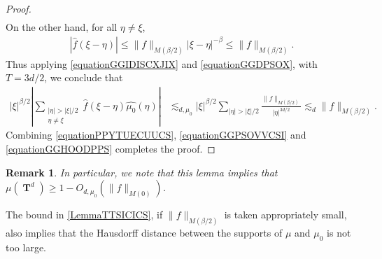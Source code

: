 \documentclass[12pt,reqno]{article}
\numberwithin{equation}{section}
\DeclareMathOperator{\TT}{\mathbf{T}}
\newtheorem{remark}{Remark}
\begin{document}
\begin{proof}
\begin{equation}
\begin{split}
    \end{split}
    \end{equation}
    On the other hand, for all $\eta \neq \xi$,
    \begin{equation} \label{equationGGDPSOX}
    \begin{split}
        |\widehat{f}(\xi - \eta)| \leq  \| f \|_{M(\beta/2)} |\xi - \eta|^{-\beta} \leq \| f \|_{M(\beta/2)}.
    \end{split}
    \end{equation}
    Thus applying \eqref{equationGGIDISCXJIX} and \eqref{equationGGDPSOX}, with $T = 3d/2$, we conclude that
    \begin{equation} \label{equationGGHOODPPS}
    \begin{split}
        |\xi|^{\beta/2} \left| \sum_{\substack{|\eta| > |\xi|/2\\ \eta \neq \xi}} \widehat{f}(\xi - \eta) \widehat{\mu_0}(\eta) \right| &\lesssim_{d,\mu_0} |\xi|^{\beta/2} \sum_{|\eta| > |\xi|/2} \frac{\| f \|_{M(\beta/2)}}{|\eta|^{3d/2}} \lesssim_d \| f \|_{M(\beta/2)}.
    \end{split}
    \end{equation}
    Combining \eqref{equationPPYTUECUUCS}, \eqref{equationGGPSOVVCSI} and \eqref{equationGGHOODPPS} completes the proof.
\end{proof}

\begin{remark} \label{remarkFOIJIOSJCIOSJ}
    In particular, we note that this lemma implies that $\mu(\TT^d) \geq 1 - O_{d,\mu_0}(\| f \|_{M(0)})$.
\end{remark}

The bound in \eqref{LemmaTTSICICS}, if $\| f \|_{M(\beta/2)}$ is taken appropriately small, also implies that the Hausdorff distance between the supports of $\mu$ and $\mu_0$ is not too large.
\end{document}
